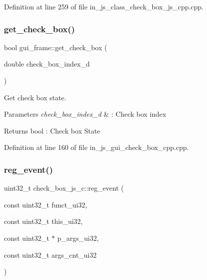 Definition at line 259 of file in\+\_\+js\+\_\+class\+\_\+check\+\_\+box\+\_\+js\+\_\+cpp.\+cpp.

\mbox{\label{group___check__box_ga3834bd188937de961f526caa3117ec9d}} 
\subsubsection{get\_check\_box()}
{\footnotesize\ttfamily bool gui\+\_\+frame\+::get\+\_\+check\+\_\+box (\begin{DoxyParamCaption}\item[{double}]{check\+\_\+box\+\_\+index\+\_\+d }\end{DoxyParamCaption})}



Get check box state. 


\begin{DoxyParams}{Parameters}
{\em check\+\_\+box\+\_\+index\+\_\+d} & \+: Check box index \\
\hline
\end{DoxyParams}
\begin{DoxyReturn}{Returns}
bool \+: Check box State 
\end{DoxyReturn}


Definition at line 160 of file in\+\_\+js\+\_\+gui\+\_\+check\+\_\+box\+\_\+cpp.\+cpp.

\mbox{\label{group___check__box_ga13fbce11602079289779215749d6cde3}} 
\subsubsection{reg\_event()}
{\footnotesize\ttfamily uint32\+\_\+t check\+\_\+box\+\_\+js\+\_\+c\+::reg\+\_\+event (\begin{DoxyParamCaption}\item[{const uint32\+\_\+t}]{funct\+\_\+ui32,  }\item[{const uint32\+\_\+t}]{this\+\_\+ui32,  }\item[{const uint32\+\_\+t $\ast$}]{p\+\_\+args\+\_\+ui32,  }\item[{const uint32\+\_\+t}]{args\+\_\+cnt\+\_\+ui32 }\end{DoxyParamCaption})\hspace{0.3cm}{\ttfamily [static]}}



